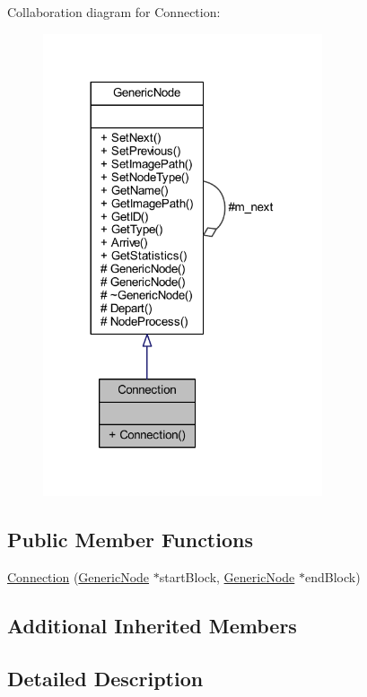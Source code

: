 Collaboration diagram for Connection\+:
\nopagebreak
\begin{figure}[H]
\begin{center}
\leavevmode
\includegraphics[width=233pt]{class_connection__coll__graph}
\end{center}
\end{figure}
\subsection*{Public Member Functions}
\begin{DoxyCompactItemize}
\item 
\hyperlink{class_connection_a9f0ec6c9f46d973813357248e2600695}{Connection} (\hyperlink{class_generic_node}{Generic\+Node} $\ast$start\+Block, \hyperlink{class_generic_node}{Generic\+Node} $\ast$end\+Block)
\end{DoxyCompactItemize}
\subsection*{Additional Inherited Members}


\subsection{Detailed Description}


